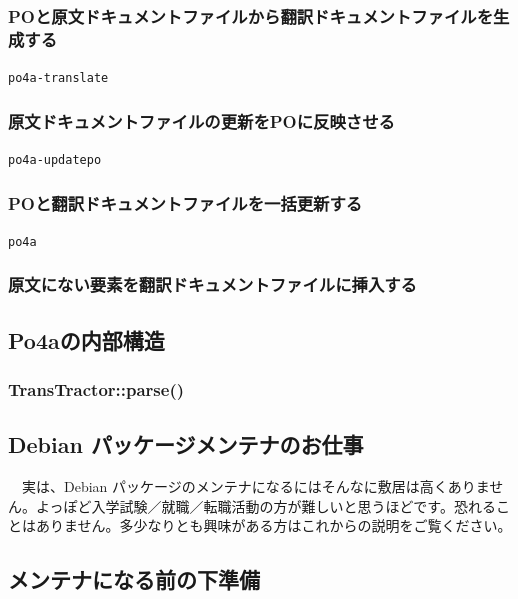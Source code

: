\documentclass[mingoth,a4paper]{jsarticle}
\begin{document}
\subsubsection{POと原文ドキュメントファイルから翻訳ドキュメントファイルを生成する}

\texttt{po4a-translate}

\subsubsection{原文ドキュメントファイルの更新をPOに反映させる}

\texttt{po4a-updatepo}

\subsubsection{POと翻訳ドキュメントファイルを一括更新する}

\texttt{po4a}

\subsubsection{原文にない要素を翻訳ドキュメントファイルに挿入する}

\subsection{Po4aの内部構造}

\subsubsection{TransTractor::parse()}


\label{sec:dm-yamane}

\subsection{Debian パッケージメンテナのお仕事}

　実は、Debian パッケージのメンテナになるにはそんなに敷居は高くありません。よっぽど入学試験／就職／転職活動の方が難しいと思うほどです。恐れることはありません。多少なりとも興味がある方はこれからの説明をご覧ください。

\subsection{メンテナになる前の下準備}
\end{document}
